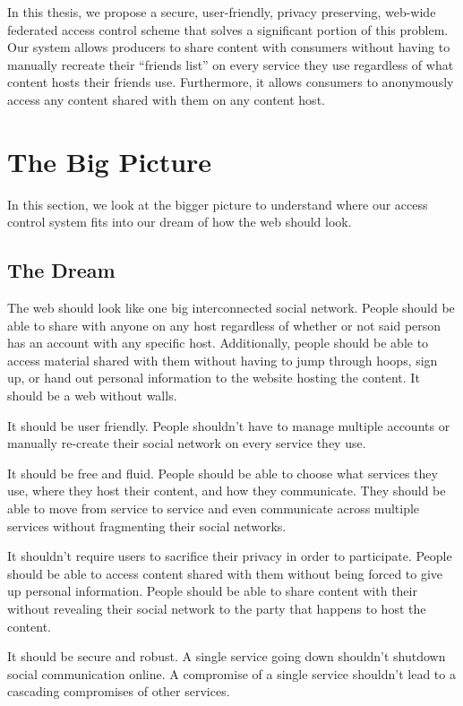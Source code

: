 \documentclass[pdftex,12pt,a4papaer,twoside,notitlepage]{report}
\begin{document}
In this thesis, we propose a secure, user-friendly, privacy preserving, web-wide
federated access control scheme that solves a significant portion of this
problem. Our system allows producers to share content with consumers without
having to manually recreate their ``friends list'' on every service they use
regardless of what content hosts their friends use. Furthermore, it allows
consumers to anonymously access any content shared with them on any content
host.

\section{The Big Picture}

In this section, we look at the bigger picture to understand where our access
control system fits into our dream of how the web should look.

\subsection{The Dream}

The web should look like one big interconnected social network. People should be
able to share with anyone on any host regardless of whether or not said person
has an account with any specific host. Additionally, people should be able to
access material shared with them without having to jump through hoops, sign up,
or hand out personal information to the website hosting the content. It should
be a web without walls.

It should be user friendly. People shouldn't have to manage multiple accounts or
manually re-create their social network on every service they use.

It should be free and fluid. People should be able to choose what services they
use, where they host their content, and how they communicate. They should be
able to move from service to service and even communicate across multiple
services without fragmenting their social networks.

It shouldn't require users to sacrifice their privacy in order to participate.
People should be able to access content shared with them without being forced to
give up personal information. People should be able to share content with their
without revealing their social network to the party that happens to host the
content.

It should be secure and robust. A single service going down shouldn't shutdown
social communication online. A compromise of a single service shouldn't lead to
a cascading compromises of other services.
\end{document}
